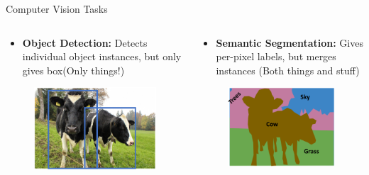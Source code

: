 \begin{frame}{Computer Vision Tasks}
\begin{columns}
    \begin{column}{0.5\textwidth}
        \begin{itemize}
            \item \textbf{Object Detection:} Detects individual object instances, but only gives box(Only things!)
        \end{itemize}
        \begin{figure}
        \centering
        \includegraphics[width=1.0\textwidth,height=1.0\textheight,keepaspectratio]{images/segmentation/ins_2.png}
        \end{figure}
    \end{column}
    \begin{column}{0.5\textwidth}
        \begin{itemize}
            \item \textbf{Semantic Segmentation:} Gives per-pixel labels, but merges instances (Both things and stuff)
        \end{itemize}
        \begin{figure}
        \centering
        \includegraphics[width=1.0\textwidth,height=1.0\textheight,keepaspectratio]{images/segmentation/ins_3.png}
        \end{figure}
    \end{column}
\end{columns}
    
\end{frame}